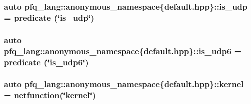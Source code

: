 \hypertarget{namespacepfq__lang_1_1anonymous__namespace_02default_8hpp_03_a120b37089690955fc25203beb98f0fe7}{
\subsubsection[{is\+\_\+udp}]{\setlength{\rightskip}{0pt plus 5cm}auto pfq\+\_\+lang\+::anonymous\+\_\+namespace\{default.\+hpp\}\+::is\+\_\+udp = {\bf predicate} (\char`\"{}is\+\_\+udp\char`\"{})}}\label{namespacepfq__lang_1_1anonymous__namespace_02default_8hpp_03_a120b37089690955fc25203beb98f0fe7}
\hypertarget{namespacepfq__lang_1_1anonymous__namespace_02default_8hpp_03_a31e93829d19f72f4aece81f57d7cef9c}{
\subsubsection[{is\+\_\+udp6}]{\setlength{\rightskip}{0pt plus 5cm}auto pfq\+\_\+lang\+::anonymous\+\_\+namespace\{default.\+hpp\}\+::is\+\_\+udp6 = {\bf predicate} (\char`\"{}is\+\_\+udp6\char`\"{})}}\label{namespacepfq__lang_1_1anonymous__namespace_02default_8hpp_03_a31e93829d19f72f4aece81f57d7cef9c}
\hypertarget{namespacepfq__lang_1_1anonymous__namespace_02default_8hpp_03_a68a2502f951a2b671a7d0496609f5d2a}{
\subsubsection[{kernel}]{\setlength{\rightskip}{0pt plus 5cm}auto pfq\+\_\+lang\+::anonymous\+\_\+namespace\{default.\+hpp\}\+::kernel = {\bf netfunction}(\char`\"{}kernel\char`\"{})}}\label{namespacepfq__lang_1_1anonymous__namespace_02default_8hpp_03_a68a2502f951a2b671a7d0496609f5d2a}
